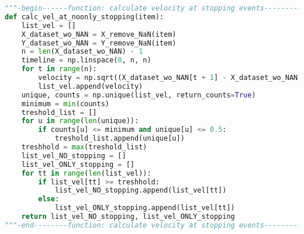 \begin{lstlisting}[language=Python, basicstyle=\tiny, frame=single, keywordstyle=\color{teal}, commentstyle=\color{olive}, stringstyle=\color{red}]
"""-begin------function: calculate velocity at stopping events---------------"""
def calc_vel_at_noonly_stopping(item):
    list_vel = []
    X_dataset_wo_NAN = X_remove_NaN(item)
    Y_dataset_wo_NAN = Y_remove_NaN(item)
    n = len(X_dataset_wo_NAN) - 1
    timeline = np.linspace(0, n, n)
    for t in range(n):
        velocity = np.sqrt((X_dataset_wo_NAN[t + 1] - X_dataset_wo_NAN[t]) ** 2 + (Y_dataset_wo_NAN[t + 1] - Y_dataset_wo_NAN[t]) ** 2)
        list_vel.append(velocity)
    unique, counts = np.unique(list_vel, return_counts=True)
    minimum = min(counts)
    treshold_list = []
    for u in range(len(unique)):
        if counts[u] <= minimum and unique[u] <= 0.5:
            treshold_list.append(unique[u])
    treshhold = max(treshold_list)
    list_vel_NO_stopping = []
    list_vel_ONLY_stopping = []
    for tt in range(len(list_vel)):
        if list_vel[tt] >= treshhold:
            list_vel_NO_stopping.append(list_vel[tt])
        else:
            list_vel_ONLY_stopping.append(list_vel[tt])
    return list_vel_NO_stopping, list_vel_ONLY_stopping
"""-end--------function: calculate velocity at stopping events---------------"""


\end{lstlisting}
